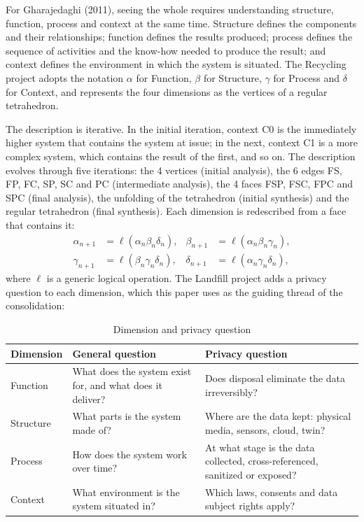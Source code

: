 \documentclass[12pt,a4paper,article,oneside,brazil,english]{abntex2}
\newcommand{\fontetab}[1]{\par\vspace{3pt}{\small\noindent Source: #1\par}}
\begin{document}
For Gharajedaghi (2011), seeing the whole requires understanding structure, function, process and context at the same time. Structure defines the components and their relationships; function defines the results produced; process defines the sequence of activities and the know-how needed to produce the result; and context defines the environment in which the system is situated. The Recycling project adopts the notation $\alpha$ for Function, $\beta$ for Structure, $\gamma$ for Process and $\delta$ for Context, and represents the four dimensions as the vertices of a regular tetrahedron.

The description is iterative. In the initial iteration, context C0 is the immediately higher system that contains the system at issue; in the next, context C1 is a more complex system, which contains the result of the first, and so on. The description evolves through five iterations: the 4 vertices (initial analysis), the 6 edges FS, FP, FC, SP, SC and PC (intermediate analysis), the 4 faces FSP, FSC, FPC and SPC (final analysis), the unfolding of the tetrahedron (initial synthesis) and the regular tetrahedron (final synthesis). Each dimension is redescribed from a face that contains it:
\begin{align*}
\alpha_{n+1} &= \ell(\alpha_n \beta_n \delta_n), & \beta_{n+1} &= \ell(\alpha_n \beta_n \gamma_n),\\
\gamma_{n+1} &= \ell(\beta_n \gamma_n \delta_n), & \delta_{n+1} &= \ell(\alpha_n \gamma_n \delta_n),
\end{align*}
where $\ell$ is a generic logical operation. The Landfill project adds a privacy question to each dimension, which this paper uses as the guiding thread of the consolidation:

\begin{table}[!htbp]
\centering
\caption{Dimension and privacy question}
\label{tab:dimensao-pergunta}
\small
\begin{tabularx}{\linewidth}{l Y Y}
\hline
\textbf{Dimension} & \textbf{General question} & \textbf{Privacy question}\\
\hline
Function & What does the system exist for, and what does it deliver? & Does disposal eliminate the data irreversibly?\\
Structure & What parts is the system made of? & Where are the data kept: physical media, sensors, cloud, twin?\\
Process & How does the system work over time? & At what stage is the data collected, cross-referenced, sanitized or exposed?\\
Context & What environment is the system situated in? & Which laws, consents and data subject rights apply?\\
\hline
\end{tabularx}
\fontetab{Prepared by the authors (2026).}
\end{table}
\end{document}
